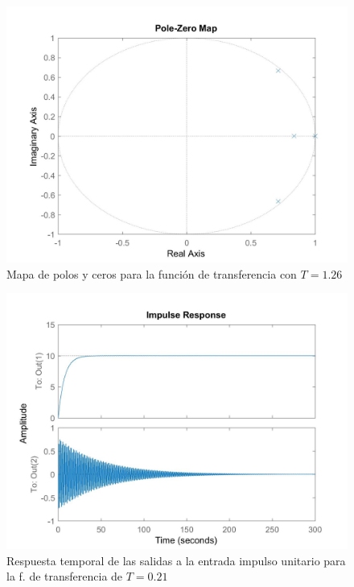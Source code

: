 \documentclass[journal]{IEEEtran}
\begin{document}
\begin{figure}[t]
\caption{Mapa de polos y ceros para la función de transferencia con $T=1.26$\label{fig:pzGd2}}
  \centering
\includegraphics[scale=0.18]{tf/pzmap_Gd_2.jpg}
\end{figure}

\begin{figure}[t]
\caption{Respuesta temporal de las salidas a la entrada impulso unitario para la f. de transferencia de $T=0.21$\label{fig:impulseGd}}
  \centering
\includegraphics[scale=0.18]{tf/impulse_Gd.jpg}
\end{figure}
\end{document}
